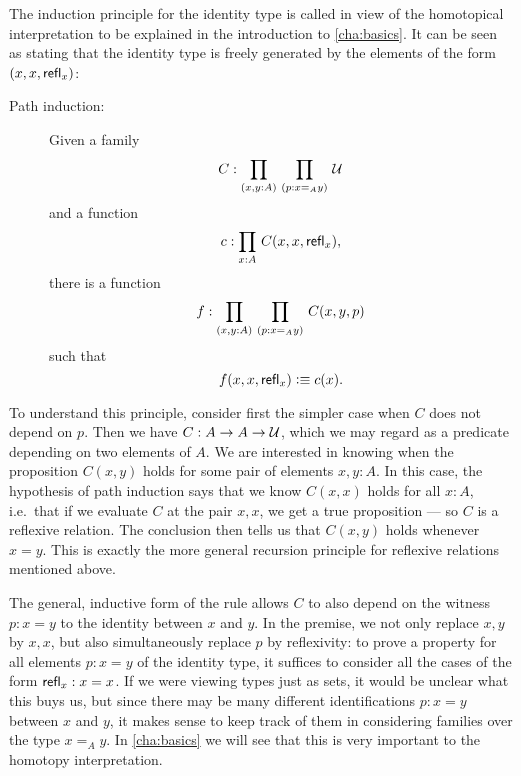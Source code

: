 
The induction principle for the identity type is called  in view of the homotopical interpretation to be explained in  the introduction to \autoref{cha:basics}.  It can be seen as stating that the identity type is freely generated by the elements of the form $(x,x,\mathsf{refl}_{x})$:

\begin{description}
\item[Path induction:] 
  Given a family 
  \[ C : \prd{x,y:A}{p:x =_A y} \UU \]
  and a function
  \[ c :  \prd{x:A} C(x,x,\refl{x}),\]
  there is a function
  \[ f : \prd{x,y:A}{p:x =_A y} C(x,y,p) \]
  such that 
  \[ f(x,x,\mathsf{refl}_{x}) \vcentcolon\equiv c(x). \]
\end{description}

%
To understand this principle, consider first the simpler case when $C$ does not depend on $p$.
Then we have $C:A\to A\to \mathcal{U}$, which we may regard as a predicate depending on two elements of $A$.
We are interested in knowing when the proposition $C(x,y)$ holds for some pair of elements $x,y:A$.
In this case, the hypothesis of path induction says that we know $C(x,x)$ holds for all $x:A$, i.e.\ that if we evaluate $C$ at the pair $x, x$, we get a true proposition --- so $C$ is a reflexive relation.
The conclusion then tells us that $C(x,y)$ holds whenever $x=y$.  This is exactly the more general recursion principle for reflexive relations mentioned above.

The general, inductive form of the rule allows $C$ to also depend on the witness $p:x=y$ to the identity between $x$ and $y$.  In the premise, we not only replace $x, y$ by $x,x$, but also simultaneously replace $p$ by reflexivity: to prove a property for all elements $p : x = y$ of the identity type, it suffices to consider all the cases of the form $\mathsf{refl}_{x}: x = x$.  If we were viewing types just as sets, it would be unclear what this buys us, but since there may be many different identifications $p : x = y$ between $x$ and $y$, it makes sense to keep track of them in considering families over the type $x =_A y$.
In \autoref{cha:basics} we will see that this is very important to the homotopy interpretation.


